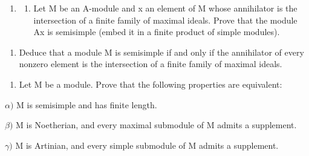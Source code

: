 
\begin{enumerate}
\def\labelenumi{\arabic{enumi})}
\tightlist
\item
  \begin{enumerate}
  \def\labelenumii{\alph{enumii})}
  \tightlist
  \item
    Let M be an A-module and x an element of M whose annihilator is the intersection of a finite family of maximal ideals. Prove that the module Ax is semisimple (embed it in a finite product of simple modules).
  \end{enumerate}
\end{enumerate}

\begin{enumerate}
\def\labelenumi{\alph{enumi})}
\setcounter{enumi}{1}
\tightlist
\item
  Deduce that a module M is semisimple if and only if the annihilator of every nonzero element is the intersection of a finite family of maximal ideals.
\end{enumerate}

\begin{enumerate}
\def\labelenumi{\arabic{enumi})}
\setcounter{enumi}{1}
\tightlist
\item
  Let M be a module. Prove that the following properties are equivalent:
\end{enumerate}

\(\alpha)\) M is semisimple and has finite length.

\(\beta)\) M is Noetherian, and every maximal submodule of M admits a supplement.

\(\gamma)\) M is Artinian, and every simple submodule of M admits a supplement.

